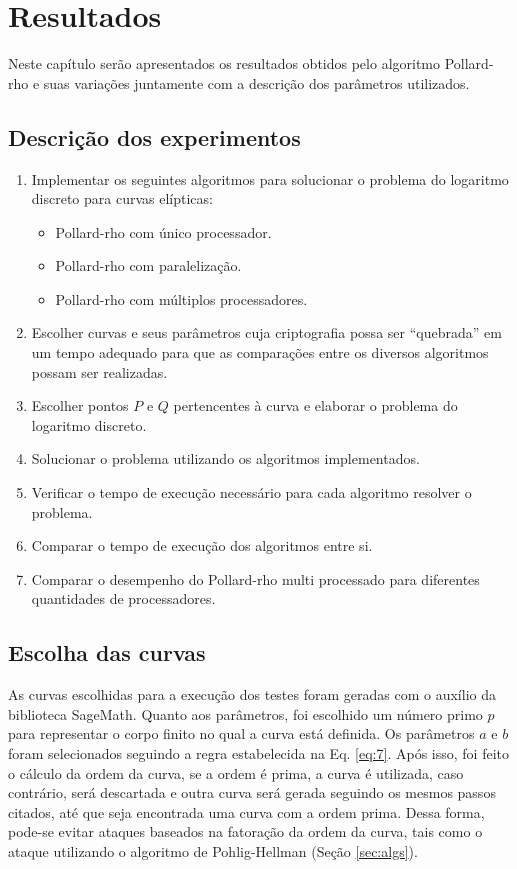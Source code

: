 \chapter{Resultados}
Neste capítulo serão apresentados os resultados obtidos pelo algoritmo Pollard-rho e suas variações juntamente com a descrição dos parâmetros utilizados.

\section{Descrição dos experimentos}
\begin{enumerate}

\item Implementar os seguintes algoritmos para solucionar o problema do logaritmo discreto para curvas elípticas:
  \begin{itemize}
  \item Pollard-rho com único processador.
  \item Pollard-rho com paralelização.
  \item Pollard-rho com múltiplos processadores.
  \end{itemize}
\item Escolher curvas e seus parâmetros cuja criptografia possa ser ``quebrada'' em um tempo adequado para que as comparações entre os diversos algoritmos possam ser realizadas.
\item Escolher pontos \(P\) e \(Q\) pertencentes à curva e elaborar o problema do logaritmo discreto.
\item Solucionar o problema utilizando os algoritmos implementados.
\item Verificar o tempo de execução necessário para cada algoritmo resolver o problema.
\item Comparar o tempo de execução dos algoritmos entre si.
\item Comparar o desempenho do Pollard-rho multi processado para diferentes quantidades de processadores.

\end{enumerate}

\section{Escolha das curvas}
As curvas escolhidas para a execução dos testes foram geradas com o auxílio da biblioteca SageMath. Quanto aos parâmetros, foi escolhido um número primo \(p\) para representar o corpo finito no qual a curva está definida. Os parâmetros \(a\) e \(b\) foram selecionados seguindo a regra estabelecida na Eq. \ref{eq:7}. Após isso, foi feito o cálculo da ordem da curva, se a ordem é prima, a curva é utilizada, caso contrário, será descartada e outra curva será gerada seguindo os mesmos passos citados, até que seja encontrada uma curva com a ordem prima. Dessa forma, pode-se evitar ataques baseados na fatoração da ordem da curva, tais como o ataque utilizando o algoritmo de Pohlig-Hellman (Seção \ref{sec:algs}).

